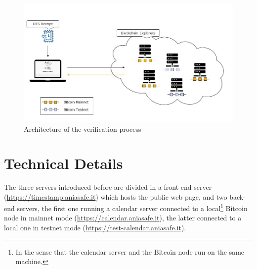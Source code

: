 \bigskip
\begin{figure}[ht]
    \centering
	\includegraphics[width=1\linewidth]{Images/project-verifying.jpg}
	\caption{Architecture of the verification process}
	\label{fig:ots-project-verifying}
\end{figure}

\bigskip
\section{Technical Details}
The three servers introduced before are divided in a front-end server (\url{https://timestamp.aniasafe.it}) which hosts the public web page, and two back-end servers, the first one running a calendar server connected to a local\footnote{In the sense that the calendar server and the Bitcoin node run on the same machine.} Bitcoin node in mainnet mode (\url{https://calendar.aniasafe.it}), the latter connected to a local one in testnet mode (\url{https://test-calendar.aniasafe.it}).